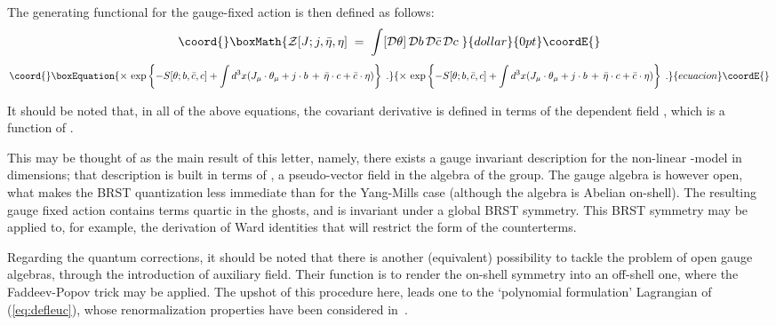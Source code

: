 \documentclass[a4paper,12pt]{article}
\begin{document}
The generating functional for the gauge-fixed action is then defined 
as follows:
$$\coord{}\boxMath{
{\mathcal Z}[J;j, {\bar\eta}, \eta] \;=\; \int [{\mathcal D}\theta]
\,{\mathcal D}b \, {\mathcal D}{\bar c} \, {\mathcal D}c \;
}{dollar}{0pt}\coordE{}$$
\begin{equation}\coord{}\boxEquation{\label{eq:defztheta}
\times \,\exp \left\{- S[\theta;b, {\bar c}, c] + 
\int d^3x ( J_\mu \cdot \theta_\mu +  j \cdot b \,+\,
{\bar\eta}\cdot c + {\bar c} \cdot \eta  ) \right\} \;.
}{\times \,\exp \left\{- S[\theta;b, {\bar c}, c] + 
\int d^3x ( J_\mu \cdot \theta_\mu +  j \cdot b \,+\,
{\bar\eta}\cdot c + {\bar c} \cdot \eta  ) \right\} \;.
}{ecuacion}\coordE{}\end{equation}

It should be noted that, in all of the above equations, the covariant
derivative is defined in terms of the dependent field \coordHE{}, which
is a function of \myHighlight{$\theta$}\coordHE{}.

This may be thought of as the main result of this letter, namely,
there exists a gauge invariant description  for the non-linear
\myHighlight{$\sigma$}\coordHE{}-model in \coordHE{} dimensions; that description is built in terms 
of \myHighlight{$\theta$}\coordHE{}, a pseudo-vector field in the algebra of the group.
The gauge algebra is however open, what makes the BRST quantization
less immediate than for the Yang-Mills case (although the algebra is
Abelian on-shell). The resulting gauge fixed action contains terms
quartic in the ghosts, and is invariant under a global BRST symmetry. 
This BRST symmetry may be applied to, for example, the derivation of
Ward identities that will restrict the form of the counterterms.

Regarding the quantum corrections, it should be noted that there is
another (equivalent) possibility to tackle the problem of open gauge algebras,
through the introduction of auxiliary field. Their function is to
render the on-shell symmetry into an off-shell one, where the
Faddeev-Popov trick may be applied. The upshot of this procedure here, 
leads one to the `polynomial formulation' Lagrangian of
(\ref{eq:defleuc}), whose renormalization properties have been
considered in~\cite{fm1}.
\end{document}
